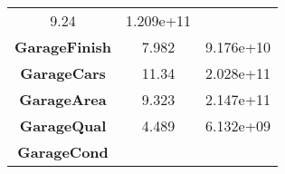 \documentclass[]{article}
\begin{document}
\begin{longtable}[c]{@{}ccc@{}}
\begin{minipage}[t]{0.16\columnwidth}
9.24
\strut\end{minipage} &
\begin{minipage}[t]{0.19\columnwidth}\centering\strut
1.209e+11
\strut\end{minipage}\tabularnewline
\begin{minipage}[t]{0.25\columnwidth}\centering\strut
\textbf{GarageFinish}
\strut\end{minipage} &
\begin{minipage}[t]{0.16\columnwidth}\centering\strut
7.982
\strut\end{minipage} &
\begin{minipage}[t]{0.19\columnwidth}\centering\strut
9.176e+10
\strut\end{minipage}\tabularnewline
\begin{minipage}[t]{0.25\columnwidth}\centering\strut
\textbf{GarageCars}
\strut\end{minipage} &
\begin{minipage}[t]{0.16\columnwidth}\centering\strut
11.34
\strut\end{minipage} &
\begin{minipage}[t]{0.19\columnwidth}\centering\strut
2.028e+11
\strut\end{minipage}\tabularnewline
\begin{minipage}[t]{0.25\columnwidth}\centering\strut
\textbf{GarageArea}
\strut\end{minipage} &
\begin{minipage}[t]{0.16\columnwidth}\centering\strut
9.323
\strut\end{minipage} &
\begin{minipage}[t]{0.19\columnwidth}\centering\strut
2.147e+11
\strut\end{minipage}\tabularnewline
\begin{minipage}[t]{0.25\columnwidth}\centering\strut
\textbf{GarageQual}
\strut\end{minipage} &
\begin{minipage}[t]{0.16\columnwidth}\centering\strut
4.489
\strut\end{minipage} &
\begin{minipage}[t]{0.19\columnwidth}\centering\strut
6.132e+09
\strut\end{minipage}\tabularnewline
\begin{minipage}[t]{0.25\columnwidth}\centering\strut
\textbf{GarageCond}
\strut\end{minipage} &
\begin{minipage}[t]{0.16\columnwidth}\centering\strut

\end{minipage}
\end{longtable}
\end{document}
